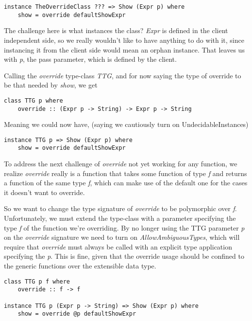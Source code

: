 \documentclass{article}
\begin{document}
\begin{lstlisting}
instance TheOverrideClass ??? => Show (Expr p) where
    show = override defaultShowExpr
\end{lstlisting}

The challenge here is what instances the class? \emph{Expr} is defined in the
client independent side, so we really wouldn't like to have anything to do with
it, since instancing it from the client side would mean an orphan instance. That
leaves us with \emph{p}, the pass parameter, which is defined by the client.

Calling the \emph{override} type-class \emph{TTG}, and for now saying the type
of override to be that needed by \emph{show}, we get

\begin{lstlisting}
class TTG p where
    override :: (Expr p -> String) -> Expr p -> String
\end{lstlisting}

Meaning we could now have, (saying we cautiously turn on UndecidableInstances)
\begin{lstlisting}
instance TTG p => Show (Expr p) where
    show = override defaultShowExpr
\end{lstlisting}

To address the next challenge of \emph{override} not yet working for any
function, we realize \emph{override} really is a function that takes some
function of type \emph{f} and returns a function of the same type \emph{f},
which can make use of the default one for the cases it doesn't want to override.

So we want to change the type signature of \emph{override} to be polymorphic
over \emph{f}. Unfortunately, we must extend the type-class with a parameter
specifying the type \emph{f} of the function we're overriding. By no longer
using the TTG parameter \emph{p} on the \emph{override} signature we need to
turn on \emph{AllowAmbiguousTypes}, which will require that \emph{override}
must always be called with an explicit type application specifying the \emph{p}.
This is fine, given that the override usage should be confined to the generic
functions over the extensible data type.

\begin{lstlisting}
class TTG p f where
    override :: f -> f

instance TTG p (Expr p -> String) => Show (Expr p) where
    show = override @p defaultShowExpr
\end{lstlisting}
\end{document}
